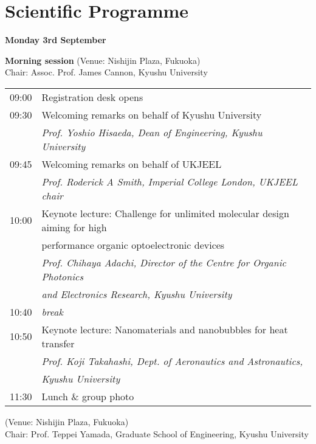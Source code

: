 \section{Scientific Programme}

\begin{center}
{\bf \large Monday 3rd September}
\end{center}
\vspace*{3ex}
{\bf Morning session} (Venue: Nishijin Plaza, Fukuoka)\\
Chair: Assoc. Prof. James Cannon, Kyushu University

\vspace{1em}
\noindent\begin{tabular}{|l|l|}
    \hline
    09:00   & Registration desk opens \\
    09:30   & Welcoming remarks on behalf of  Kyushu University \\
            & \emph{Prof. Yoshio Hisaeda, Dean of Engineering, Kyushu University} \\
    09:45   & Welcoming remarks on behalf of UKJEEL \\
            & \emph{Prof. Roderick A Smith, Imperial College London, UKJEEL chair} \\
    10:00   & Keynote lecture: Challenge for unlimited molecular design aiming for high\\
            &  \hspace{7.5em} performance organic optoelectronic devices \\
            & \emph{Prof. Chihaya Adachi, Director of the Centre for Organic Photonics}\\
            & \emph{and Electronics Research, Kyushu University} \\
    10:40   & \emph{break} \\
    10:50   & Keynote lecture: Nanomaterials and nanobubbles for heat transfer \\
            & \emph{Prof. Koji Takahashi, Dept. of Aeronautics and Astronautics,} \\
            & \emph{Kyushu University} \\
    11:30   & Lunch \& group photo \\
    \hline
\end{tabular}

\newpage
\vspace{-3em}
 (Venue: Nishijin Plaza, Fukuoka)\\
Chair: Prof. Teppei Yamada, Graduate School of Engineering, Kyushu University

